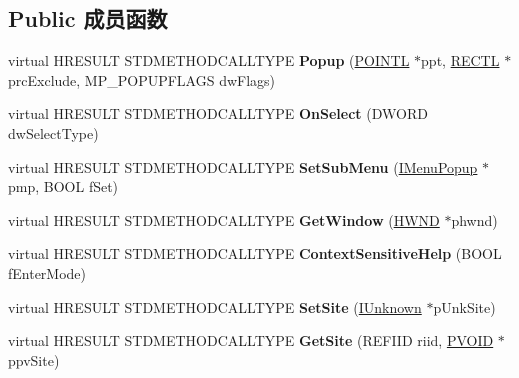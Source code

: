 \subsection*{Public 成员函数}
\begin{DoxyCompactItemize}
\item 
\mbox{\label{class_c_menu_desk_bar_a40af6addff540322886d8d646575535f}} 
virtual H\+R\+E\+S\+U\+LT S\+T\+D\+M\+E\+T\+H\+O\+D\+C\+A\+L\+L\+T\+Y\+PE {\bfseries Popup} (\hyperlink{struct___p_o_i_n_t_l}{P\+O\+I\+N\+TL} $\ast$ppt, \hyperlink{struct___r_e_c_t_l}{R\+E\+C\+TL} $\ast$prc\+Exclude, M\+P\+\_\+\+P\+O\+P\+U\+P\+F\+L\+A\+GS dw\+Flags)
\item 
\mbox{\label{class_c_menu_desk_bar_adaa368df7e4056f19bab7d0fab7c7f07}} 
virtual H\+R\+E\+S\+U\+LT S\+T\+D\+M\+E\+T\+H\+O\+D\+C\+A\+L\+L\+T\+Y\+PE {\bfseries On\+Select} (D\+W\+O\+RD dw\+Select\+Type)
\item 
\mbox{\label{class_c_menu_desk_bar_afce590afe3d538183b66bf0d50c9b4a2}} 
virtual H\+R\+E\+S\+U\+LT S\+T\+D\+M\+E\+T\+H\+O\+D\+C\+A\+L\+L\+T\+Y\+PE {\bfseries Set\+Sub\+Menu} (\hyperlink{interface_i_menu_popup}{I\+Menu\+Popup} $\ast$pmp, B\+O\+OL f\+Set)
\item 
\mbox{\label{class_c_menu_desk_bar_a3cec969ff5ab6c15c02e51ccb73df8b7}} 
virtual H\+R\+E\+S\+U\+LT S\+T\+D\+M\+E\+T\+H\+O\+D\+C\+A\+L\+L\+T\+Y\+PE {\bfseries Get\+Window} (\hyperlink{interfacevoid}{H\+W\+ND} $\ast$phwnd)
\item 
\mbox{\label{class_c_menu_desk_bar_a514b3bc58eee9fc5420bb27fc53fb05c}} 
virtual H\+R\+E\+S\+U\+LT S\+T\+D\+M\+E\+T\+H\+O\+D\+C\+A\+L\+L\+T\+Y\+PE {\bfseries Context\+Sensitive\+Help} (B\+O\+OL f\+Enter\+Mode)
\item 
\mbox{\label{class_c_menu_desk_bar_ac31e9e6a9c7c3cba25d14bef02ad2392}} 
virtual H\+R\+E\+S\+U\+LT S\+T\+D\+M\+E\+T\+H\+O\+D\+C\+A\+L\+L\+T\+Y\+PE {\bfseries Set\+Site} (\hyperlink{interface_i_unknown}{I\+Unknown} $\ast$p\+Unk\+Site)
\item 
\mbox{\label{class_c_menu_desk_bar_ac827646be18fc632e5a9aed88b4151f3}} 
virtual H\+R\+E\+S\+U\+LT S\+T\+D\+M\+E\+T\+H\+O\+D\+C\+A\+L\+L\+T\+Y\+PE {\bfseries Get\+Site} (R\+E\+F\+I\+ID riid, \hyperlink{interfacevoid}{P\+V\+O\+ID} $\ast$ppv\+Site)

\end{DoxyCompactItemize}

